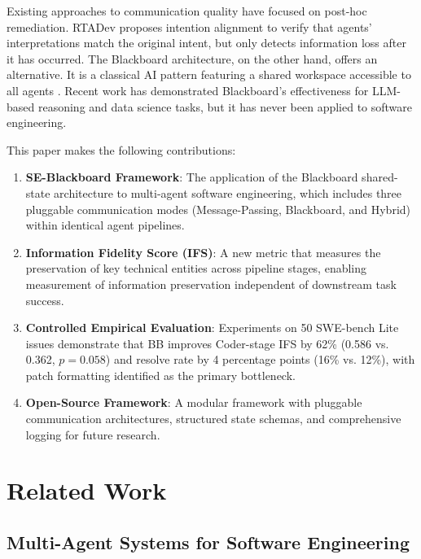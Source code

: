 \documentclass{ieeeaccess}
\begin{document}
Existing approaches to communication quality have focused on post-hoc remediation. RTADev \cite{fang2025rtadev} proposes intention alignment to verify that agents' interpretations match the original intent, but only detects information loss after it has occurred. The Blackboard architecture, on the other hand, offers an alternative. It is a classical AI pattern featuring a shared workspace accessible to all agents \cite{nii1986blackboard}. Recent work has demonstrated Blackboard's effectiveness for LLM-based reasoning \cite{wang2025lbmas} and data science \cite{salemi2025llm} tasks, but it has never been applied to software engineering.

This paper makes the following contributions:

\begin{enumerate}
\item \textbf{SE-Blackboard Framework}: The application of the Blackboard shared-state architecture to multi-agent software engineering, which includes three pluggable communication modes (Message-Passing, Blackboard, and Hybrid) within identical agent pipelines.

\item \textbf{Information Fidelity Score (IFS)}: A new metric that measures the preservation of key technical entities across pipeline stages, enabling measurement of information preservation independent of downstream task success.

\item \textbf{Controlled Empirical Evaluation}: Experiments on 50 SWE-bench Lite issues demonstrate that BB improves Coder-stage IFS by 62\% (0.586 vs. 0.362, $p=0.058$) and resolve rate by 4 percentage points (16\% vs. 12\%), with patch formatting identified as the primary bottleneck.

\item \textbf{Open-Source Framework}: A modular framework with pluggable communication architectures, structured state schemas, and comprehensive logging for future research.

\end{enumerate}
\section{Related Work}

\subsection{Multi-Agent Systems for Software Engineering}
\end{document}
